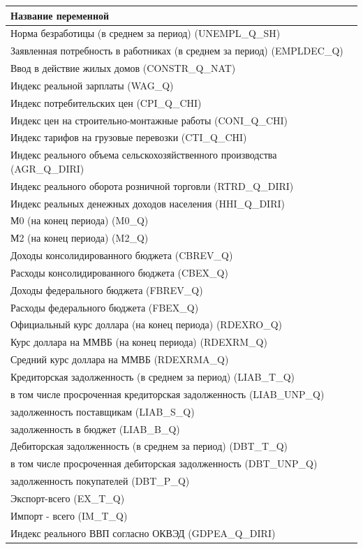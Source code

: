 \label{app:list}


\renewcommand{\thechapter}{\Asbuk{chapter}}


\begin{table}[ht]
\centering
\begin{tabular}{l}
  \hline
Название переменной \\ 
  \hline
Норма безработицы (в среднем за период)  (UNEMPL\_Q\_SH) \\ 
  Заявленная потребность в работниках (в среднем за период)  (EMPLDEC\_Q) \\ 
  Ввод в действие жилых домов  (CONSTR\_Q\_NAT) \\ 
  Индекс реальной зарплаты  (WAG\_Q) \\ 
  Индекс потребительских цен  (CPI\_Q\_CHI) \\ 
  Индекс цен на строительно-монтажные работы  (CONI\_Q\_CHI) \\ 
  Индекс тарифов на грузовые перевозки  (CTI\_Q\_CHI) \\ 
  Индекс реального объема сельскохозяйственного производства  (AGR\_Q\_DIRI) \\ 
  Индекс реального оборота розничной торговли  (RTRD\_Q\_DIRI) \\ 
  Индекс реальных денежных доходов населения  (HHI\_Q\_DIRI) \\ 
  М0 (на конец периода)  (M0\_Q) \\ 
  М2 (на конец периода)  (M2\_Q) \\ 
  Доходы консолидированного бюджета  (CBREV\_Q) \\ 
  Расходы консолидированного бюджета  (CBEX\_Q) \\ 
  Доходы федерального бюджета  (FBREV\_Q) \\ 
  Расходы федерального бюджета  (FBEX\_Q) \\ 
  Официальный курс доллара (на конец периода)  (RDEXRO\_Q) \\ 
  Курс доллара на ММВБ (на конец периода)  (RDEXRM\_Q) \\ 
  Средний курс доллара на ММВБ   (RDEXRMA\_Q) \\ 
  Кредиторская задолженность (в среднем за период)  (LIAB\_T\_Q) \\ 
  в том числе просроченная кредиторская задолженность  (LIAB\_UNP\_Q) \\ 
  задолженность поставщикам  (LIAB\_S\_Q) \\ 
  задолженность в бюджет  (LIAB\_B\_Q) \\ 
  Дебиторская задолженность (в среднем за период)  (DBT\_T\_Q) \\ 
  в том числе просроченная дебиторская задолженность  (DBT\_UNP\_Q) \\ 
  задолженность покупателей  (DBT\_P\_Q) \\ 
  Экспорт-всего  (EX\_T\_Q) \\ 
  Импорт - всего  (IM\_T\_Q) \\ 
  Индекс реального ВВП согласно ОКВЭД  (GDPEA\_Q\_DIRI) \\ 
   \hline
\end{tabular}
\end{table}
